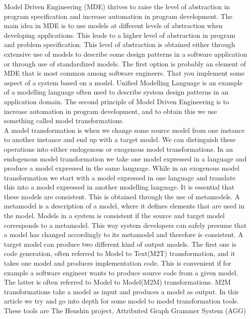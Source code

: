 \documentclass[pdftex,11pt,a4paper]{article}
\begin{document}
\noindent Model Driven Engineering (MDE)\cite{France2007} thrives to raise the
level of abstraction in program specification and increase automation in program
development. The main idea in MDE is to use models at different levels of
abstraction when developing applications. This leads to a higher level
of abstraction in program and problem specification. This level of abstraction
is obtained either through extensive use of models to describe some design
patterns in a software application or through use of standardized models. The
first option is probably an element of MDE that is most common among software
engineers. That you implement some aspect of a system based on a model. Unified
Modelling Language is an example of a modelling language often used to describe
system design patterns in an application domain. The second principle of Model
Driven Engineering is to increase automation in program development, and to
obtain this we use something called model transformations. \\
\indent A model transformation is when we change some source model from one
instance to another instance and end up with a target model. We can
distinguish these operations into either endogenous or exogenous model
transformations. In an endogenous model transformation we take one model
expressed in a language and produce a model expressed in the same language.
While in an exogenous model transformation we start with a model
expressed in one language and translate this into a model expressed in another
modelling language. It is essential that these models are consistent. This is
obtained through the use of metamodels. A metamodel is a description of a
model, where it defines elements that are used in the model. Models in a system
is consistent if the source and target model corresponds to a metamodel. This
way system developers can safely presume that a model has changed accordingly
to its metamodel and therefore is consistent. A target model can produce two
different kind of output models. The first one is code generation, often
referred to Model to Text(M2T) transformation, and it takes one model and
produces implementation code. This is convenient if for example a software
engineer wants to produce source code from a given model. The latter is often
referred to Model to Model(M2M) transformations. M2M transformations take a
model as input and produces a model as output. In this article we try and go
into depth for some model to model transformation tools. These tools are
The Henshin project\cite{Henshin}, Attributed Graph Grammer System (AGG)
\end{document}

